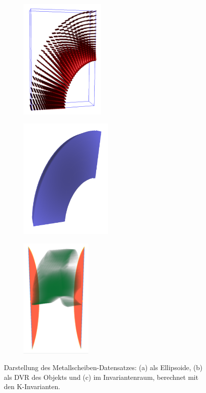 \documentclass[a4paper,fontsize=12pt,toc=bib,halfparskip]{scrartcl}
\begin{document}
\clearpage

\begin{figure}[H]
	\begin{subfigure}{0.3\textwidth}
		\centering
		\includegraphics[height=6cm]{pictures/results/MetalDiskStrain_Ellipsoids.png}
		\subcaption{}
		\label{MetalDiskStrainEllipsoids}
	\end{subfigure}
	\hspace*{\fill}
	\begin{subfigure}{0.3\textwidth}
		\centering
		\includegraphics[height=6cm]{pictures/results/MetalDiskStrain_Object.png}
		\subcaption{}
		\label{MetalDiskStrainObject}
	\end{subfigure}
	\hspace*{\fill}
	\begin{subfigure}{0.3\textwidth}
		\centering
		\includegraphics[height=6cm]{pictures/results/MetalDiskStrain_InvariantSpace.png}
		\subcaption{}
		\label{MetalDiskStrainInvariantSpace}
	\end{subfigure}
	\caption{Darstellung des Metallscheiben-Datensatzes: (a) als Ellipsoide, (b) als DVR des Objekts und (c) im Invariantenraum, berechnet mit den K-Invarianten.}
	\label{MetalDiskStrain}
\end{figure}
\end{document}
